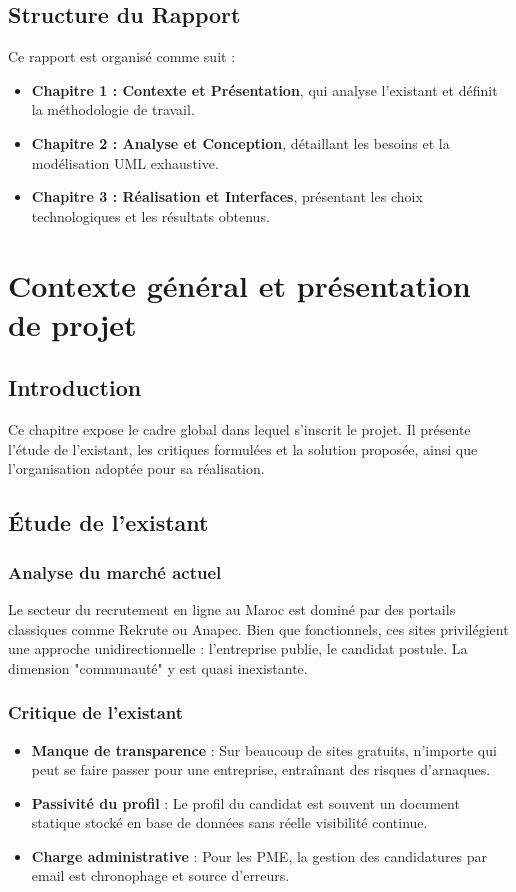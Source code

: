 \documentclass[12pt,a4paper]{report}
\begin{document}
\section*{Structure du Rapport}
Ce rapport est organisé comme suit :
\begin{itemize}
    \item \textbf{Chapitre 1 : Contexte et Présentation}, qui analyse l'existant et définit la méthodologie de travail.
    \item \textbf{Chapitre 2 : Analyse et Conception}, détaillant les besoins et la modélisation UML exhaustive.
    \item \textbf{Chapitre 3 : Réalisation et Interfaces}, présentant les choix technologiques et les résultats obtenus.
\end{itemize}

\chapter{Contexte général et présentation de projet}
\section{Introduction}
Ce chapitre expose le cadre global dans lequel s'inscrit le projet. Il présente l'étude de l'existant, les critiques formulées et la solution proposée, ainsi que l'organisation adoptée pour sa réalisation.

\section{Étude de l'existant}
\subsection{Analyse du marché actuel}
Le secteur du recrutement en ligne au Maroc est dominé par des portails classiques comme Rekrute ou Anapec. Bien que fonctionnels, ces sites privilégient une approche unidirectionnelle : l'entreprise publie, le candidat postule. La dimension "communauté" y est quasi inexistante.
\subsection{Critique de l'existant}
\begin{itemize}
    \item \textbf{Manque de transparence} : Sur beaucoup de sites gratuits, n'importe qui peut se faire passer pour une entreprise, entraînant des risques d'arnaques.
    \item \textbf{Passivité du profil} : Le profil du candidat est souvent un document statique stocké en base de données sans réelle visibilité continue.
    \item \textbf{Charge administrative} : Pour les PME, la gestion des candidatures par email est chronophage et source d'erreurs.
\end{itemize}
\end{document}
